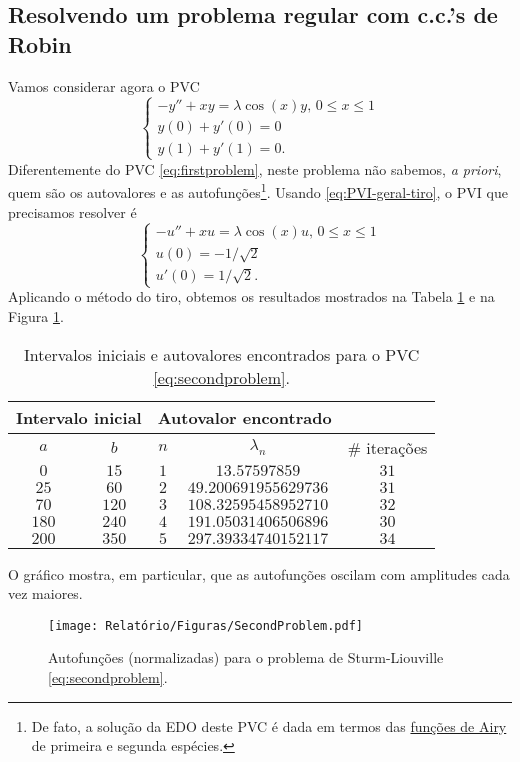\documentclass[twocolumn,showpacs,%
  nofootinbib,aps,superscriptaddress,%
  eqsecnum,prd,notitlepage,showkeys,10pt]{revtex4-1}
\renewcommand{\leq}{\leqslant}
\begin{document}
\subsection{Resolvendo um problema regular com c.c.'s de Robin}\label{subsec:aplicacao}
%
Vamos considerar agora o PVC
%
\begin{equation}
\label{eq:secondproblem}
    \left\{
        \begin{array}{l}
            -y'' + xy = \lambda\cos(x)y, \, 0 \leq x \leq 1 \\ 
            y(0) + y'(0) = 0 \\ 
            y(1) + y'(1) = 0.
        \end{array}
    \right.
\end{equation}
%
Diferentemente do PVC \eqref{eq:firstproblem}, neste problema não sabemos, \textit{a priori},
quem são os autovalores e as autofunções\footnote{De fato, a solução da EDO deste PVC
é dada em termos das \href{https://en.wikipedia.org/wiki/Airy_function}{funções de Airy}
de primeira e segunda espécies.}.
Usando \eqref{eq:PVI-geral-tiro}, o PVI que precisamos resolver é
%
\[
    \left\{
        \begin{array}{l}
            -u'' + xu = \lambda \cos(x)u, \, 0 \leq x \leq 1 \\ 
            u(0) = -1/\sqrt{2} \\ 
            u'(0) = 1/\sqrt{2}.
        \end{array}
    \right.
\]
%
Aplicando o método do tiro, obtemos os resultados mostrados
na Tabela \ref{tab:secondproblem} e na Figura \ref{fig:second-problem}.
%
\begin{table}[H]
    \centering
    \caption{Intervalos iniciais e autovalores encontrados para o PVC \eqref{eq:secondproblem}.}
    \begin{tabular}{cc|cc|c}
        \multicolumn{2}{c}{Intervalo inicial} & \multicolumn{2}{c}{Autovalor encontrado} & \\
        \hline
        $a$ & $b$ & $n$ & $\lambda_n$ & \# iterações \\
        \hline
        $0$ & $15$ & $1$ & $13.57597859$ & $31$ \\
        $25$ & $60$ & $2$ & $49.200691955629736$ & $31$ \\
        $70$ & $120$ & $3$ & $108.32595458952710$ & $32$ \\
        $180$ & $240$ & $4$ & $191.05031406506896$ & $30$ \\
        $200$ & $350$ & $5$ & $297.39334740152117$ & $34$ \\
        \hline
    \end{tabular}
    \label{tab:secondproblem}
\end{table}
%
O gráfico mostra, em particular, que as autofunções oscilam com amplitudes
cada vez maiores.
%
\begin{figure}[H]
    \centering
    \texttt{[image: Relatório/Figuras/SecondProblem.pdf]}
    \caption{Autofunções (normalizadas) para o problema de Sturm-Liouville
    \eqref{eq:secondproblem}.}
    \label{fig:second-problem}
\end{figure}
%
%
\end{document}
